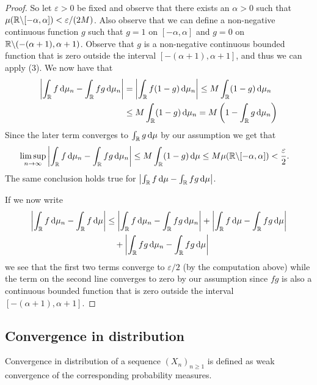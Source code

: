 \begin{proof}
So let $\varepsilon > 0$ be fixed and observe that there exists an $\alpha > 0$ such that $\mu(\mathbb R \backslash [-\alpha, \alpha]) < \varepsilon/(2M)$. Also observe that we can define a non-negative continuous function $g$ such that $g = 1$ on $[-\alpha, \alpha]$ and $g = 0$ on $\mathbb R \backslash (-(\alpha+1),\alpha+1)$. Observe that $g$ is a non-negative continuous bounded function that is zero outside the interval $[-(\alpha+1), \alpha+1]$, and thus we can apply (3). We now have that
\begin{align*}
	\left|\int_{\mathbb R} f \, \mathrm{d} \mu_n - \int_{\mathbb R} fg \, \mathrm{d} \mu_n\right|
	&= \left|\int_{\mathbb R} f (1-g) \, \mathrm{d} \mu_n\right| \le M \int_{\mathbb R} (1-g) \, \mathrm{d} \mu_n \\
	&\le M \int_{\mathbb R} (1-g) \, \mathrm{d} \mu_n = M\left(1-\int_{\mathbb R} g \, \mathrm{d} \mu_n\right)
\end{align*}
Since the later term converges to $\int_{\mathbb R} g \, \mathrm{d} \mu$ by our assumption we get that
\begin{align*}
	\limsup_{n \to \infty} \left|\int_{\mathbb R} f \, \mathrm{d} \mu_n - \int_{\mathbb R} fg \, \mathrm{d} \mu_n\right|
	&\le M \int_{\mathbb R} (1-g) \, \mathrm{d} \mu \le M \mu(\mathbb R \backslash [-\alpha,\alpha]) < \frac{\varepsilon}{2}.
\end{align*}
The same conclusion holds true for $\left|\int_{\mathbb R} f \, \mathrm{d} \mu - \int_{\mathbb R} fg \, \mathrm{d} \mu\right|$.

If we now write
\begin{align*}
	\left|\int_{\mathbb R} f \, \mathrm{d} \mu_n - \int_{\mathbb R} f \, \mathrm{d} \mu\right| &\le \left|\int_{\mathbb R} f \, \mathrm{d} \mu_n - \int_{\mathbb R} fg \, \mathrm{d} \mu_n\right| + \left|\int_{\mathbb R} f \, \mathrm{d} \mu - \int_{\mathbb R} fg \, \mathrm{d} \mu\right|\\ &\hspace{10pt}+ \left|\int_{\mathbb R} fg \, \mathrm{d} \mu_n - \int_{\mathbb R} fg \, \mathrm{d} \mu\right|
\end{align*}
we see that the first two terms converge to $\varepsilon/2$ (by the computation above) while the term on the second line converges to zero by our assumption since $fg$ is also a continuous bounded function that is zero outside the interval $[-(\alpha+1),\alpha+1]$. 
\end{proof}

\subsection{Convergence in distribution}

Convergence in distribution of a sequence $(X_n)_{n \ge 1}$ is defined as weak convergence of the corresponding probability measures.

